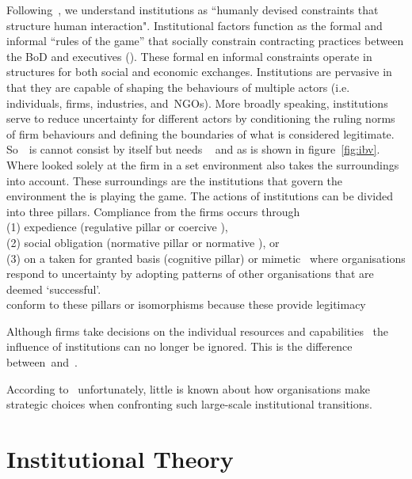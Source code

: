 Following~\cite{North:1990}, we understand institutions as ``humanly devised constraints
that structure human interaction". Institutional factors function as the formal and
informal ``rules of the game'' that socially constrain contracting practices between the \gls{BoD} and 
executives (\cite{North:1990}).  
These formal en informal constraints operate in structures for both social and economic exchanges. 
Institutions are pervasive in that they are capable of shaping the behaviours of multiple actors (i.e. 
individuals, firms, industries, and~\glspl{NGO}). More broadly speaking, institutions serve to reduce 
uncertainty for different actors by conditioning the ruling norms of firm behaviours and defining the 
boundaries of what is considered legitimate.~\cite{Peng:2008}\\

So~\ibv~is cannot consist by itself but needs \rbv~\cite{Barney:1991} and \cite{Porter:1980} as is shown in figure~\ref{fig:ibv}. 
Where \rbv looked solely at the firm in a set environment \ibv also takes the surroundings into account. These surroundings are the institutions that govern the environment the \mne is playing the game. 
The actions of institutions can be divided into three pillars. Compliance from the firms occurs through \\(1) expedience (regulative pillar or coercive \iso),\\
 (2) social obligation (normative pillar or normative \iso), or \\
 (3) on a taken for granted basis (cognitive pillar) or mimetic \iso~where organisations respond to uncertainty by adopting patterns of other organisations that are deemed `successful'\cite{Westney:2005,Peng:2008,Kostova:1999,DiMaggio:1983,Scott:1995}.\\ 
\mne conform to these pillars or isomorphisms because these provide legitimacy~\cite{Powell:1991}

Although firms take decisions on the individual resources and capabilities~\cite{Barney:1991} the influence of institutions can no longer be ignored. This is the difference between~\rbv and~\ibv. 

According to~\cite{Peng:2003} unfortunately, little is known about how organisations make strategic choices when confronting such large-scale institutional transitions.

\section{Institutional Theory}

